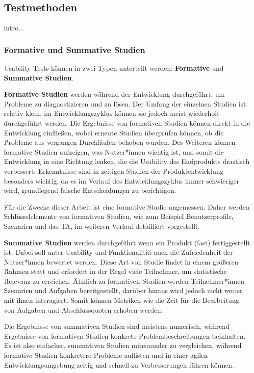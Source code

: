 
\subsection{Testmethoden}
intro...
\subsubsection{Formative und Summative Studien}
Usability Tests können in zwei Typen unterteilt werden: \textbf{Formative} und \textbf{Summative Studien}.

\textbf{Formative Studien} werden während der Entwicklung durchgeführt, um Probleme zu diagnostizieren und zu lösen. Der Umfang der einzelnen Studien ist relativ klein, im Entwicklungszyklus können sie jedoch meist wiederholt durchgeführt werden. Die Ergebnisse von formativen Studien können direkt in die Entwicklung einfließen, wobei erneute Studien überprüfen können, ob die Probleme aus vergangen Durchläufen behoben wurden. Des Weiteren können formative Studien aufzeigen, was Nutzer*innen wichtig ist, und somit die Entwicklung in eine Richtung lenken, die die Usability des Endprodukts drastisch verbessert. Erkenntnisse sind in zeitigen Stadien der Produktentwicklung besonders wichtig, da es im Verlauf des Entwicklungszyklus immer schwieriger wird, grundlegend falsche Entscheidungen zu berichtigen.

Für die Zwecke dieser Arbeit ist eine formative Studie angemessen. Daher werden Schlüsselelemente von formativen Studien, wie zum Beispiel Benutzerprofile, Szenarien und das \acl{TA}, im weiteren Verlauf detailliert vorgestellt.

\textbf{Summative Studien} werden durchgeführt wenn ein Produkt (fast) fertiggestellt ist. Dabei soll unter Usability und Funktionalität auch die Zufriedenheit der Nutzer*innen bewertet werden. Diese Art von Studie findet in einem größeren Rahmen statt und erfordert in der Regel viele Teilnehmer, um statistische Relevanz zu erreichen. Ähnlich zu formativen Studien werden Teilnehmer*innen Szenarien und Aufgaben bereitgestellt, darüber hinaus wird jedoch nicht weiter mit ihnen interagiert. Somit können Metriken wie die Zeit für die Bearbeitung von Aufgaben und Abschlussquoten erhoben werden.

Die Ergebnisse von summativen Studien sind meistens numerisch, während Ergebnisse von formativen Studien konkrete Problembeschreibungen beinhalten. Es ist also einfacher, summativen Studien miteinander zu vergleichen, während formative Studien konkretere Probleme auflisten und in einer agilen Entwicklungsumgebung zeitig und schnell zu Verbesserungen führen können.

